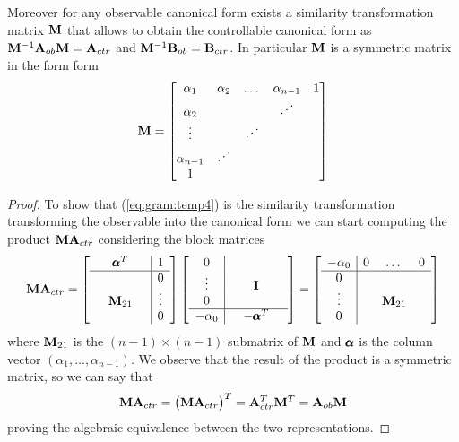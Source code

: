 	Moreover for any observable canonical form exists a similarity transformation matrix $\mathbf{M}$ that allows to obtain the controllable canonical form as $\mathbf{M}^{-1} \mathbf{A}_{ob}\mathbf{M} = \mathbf{A}_{ctr}$ and $\mathbf{M}^{-1} \mathbf{B}_{ob} = \mathbf{B}_{ctr}$. In particular $\mathbf{M}$ is a symmetric matrix in the form form
	\begin{equation} \label{eq:gram:temp4}
		\mat M = \matrix{ \alpha_1 & \alpha_2 & \dots & \alpha_{n-1} & 1 \\
		\alpha_2 & &  & \reflectbox{$\ddots$} \\
		\vdots & & \reflectbox{$\ddots$} \\
		\alpha_{n-1} & \reflectbox{$\ddots$} \\ 1}
	\end{equation}
	
	\begin{proof}
		To show that (\ref{eq:gram:temp4}) is the similarity transformation transforming the observable into the canonical form  we can start computing the product $\mathbf{M} \mathbf{A}_{ctr}$ considering the block matrices
		\[ \mathbf{M} \mathbf{A}_{ctr} = \begin{bmatrix} \begin{array}{ccc|c}
				& \pmb{\alpha}^T && 1 \\ \hline &&& 0 \\ & \mathbf{M}_{21} && \vdots \\ &&& 0
		\end{array} \end{bmatrix} \begin{bmatrix} \begin{array}{c|ccc}
			0 \\ \vdots && \mathbf{I} \\ 0 \\ \hline - \alpha_0 & & -\pmb{\alpha}^T &
		\end{array} \end{bmatrix} =  \begin{bmatrix} \begin{array}{c|ccc}
			-\alpha_0 & 0 & \dots & 0 \\ \hline 0 \\ \vdots && \mathbf{M}_{21} \\ 0
		\end{array} \end{bmatrix} \]
		where $\mathbf{M}_{21}$ is the $(n-1)\times(n-1)$ submatrix of $\mathbf{M}$ and $\pmb{\alpha}$ is the column vector $(\alpha_1,\dots , \alpha_{n-1})$. We observe that the result of the product is a symmetric matrix, so we can say that
		\[ \mathbf{M} \mathbf{A}_{ctr} = \big(\mathbf{M} \mathbf{A}_{ctr}\big)^T = \mathbf{A}_{ctr}^T \mathbf{M}^T = \mathbf{A}_{ob} \mathbf{M} \]
		proving the algebraic equivalence between the two representations.
	\end{proof}
	
